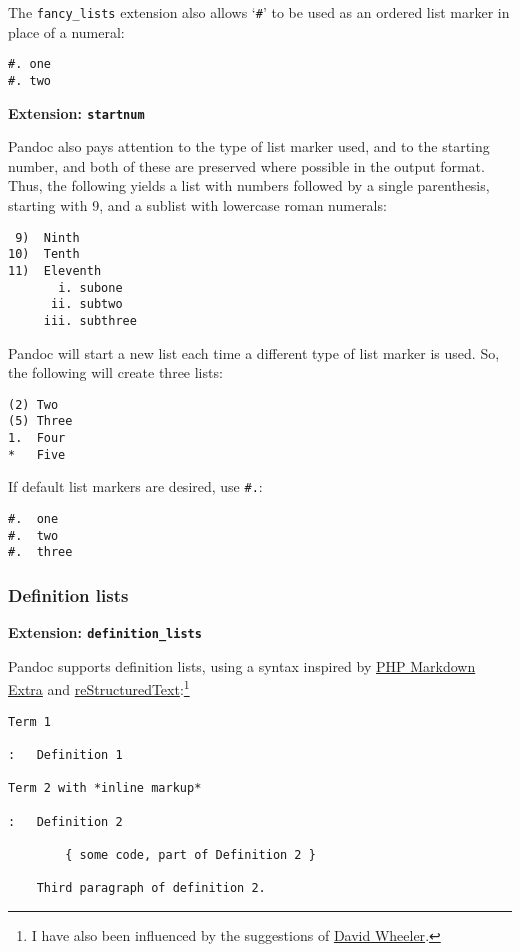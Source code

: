 \documentclass[]{article}
\begin{document}
The \texttt{fancy\_lists} extension also allows `\texttt{\#}' to be used
as an ordered list marker in place of a numeral:

\begin{verbatim}
#. one
#. two
\end{verbatim}

\textbf{Extension: \texttt{startnum}}

Pandoc also pays attention to the type of list marker used, and to the
starting number, and both of these are preserved where possible in the
output format. Thus, the following yields a list with numbers followed
by a single parenthesis, starting with 9, and a sublist with lowercase
roman numerals:

\begin{verbatim}
 9)  Ninth
10)  Tenth
11)  Eleventh
       i. subone
      ii. subtwo
     iii. subthree
\end{verbatim}

Pandoc will start a new list each time a different type of list marker
is used. So, the following will create three lists:

\begin{verbatim}
(2) Two
(5) Three
1.  Four
*   Five
\end{verbatim}

If default list markers are desired, use \texttt{\#.}:

\begin{verbatim}
#.  one
#.  two
#.  three
\end{verbatim}

\subsubsection{Definition lists}

\textbf{Extension: \texttt{definition\_lists}}

Pandoc supports definition lists, using a syntax inspired by
\href{http://www.michelf.com/projects/php-markdown/extra/}{PHP Markdown
Extra} and
\href{http://docutils.sourceforge.net/docs/ref/rst/introduction.html}{reStructuredText}:\footnote{I
  have also been influenced by the suggestions of
  \href{http://www.justatheory.com/computers/markup/modest-markdown-proposal.html}{David
  Wheeler}.}

\begin{verbatim}
Term 1

:   Definition 1

Term 2 with *inline markup*

:   Definition 2

        { some code, part of Definition 2 }

    Third paragraph of definition 2.
\end{verbatim}
\end{document}
